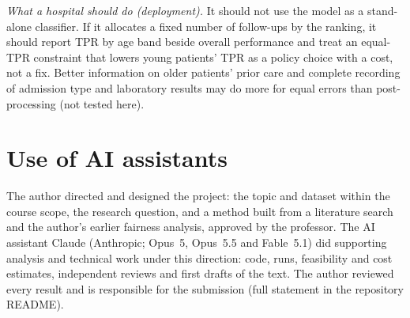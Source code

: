 \documentclass[conference]{IEEEtran}
\begin{document}
\emph{What a hospital should do (deployment).} It should not use the model as a stand-alone
classifier. If it allocates a fixed number of follow-ups by the ranking, it should report TPR by age
band beside overall performance and treat an equal-TPR constraint that lowers young patients' TPR as
a policy choice with a cost, not a fix. Better information on older patients' prior care and
complete recording of admission type and laboratory results may do more for equal errors than
post-processing (not tested here).

\section*{Use of AI assistants}
The author directed and designed the project: the topic and dataset within the course scope, the
research question, and a method built from a literature search and the author's earlier fairness
analysis, approved by the professor. The AI assistant Claude (Anthropic; Opus~5, Opus~5.5 and
Fable~5.1) did supporting analysis and technical work under this direction: code, runs,
feasibility and cost estimates, independent reviews and first drafts of the text. The author
reviewed every result and is responsible for the submission (full statement in the repository
README).



\end{document}
